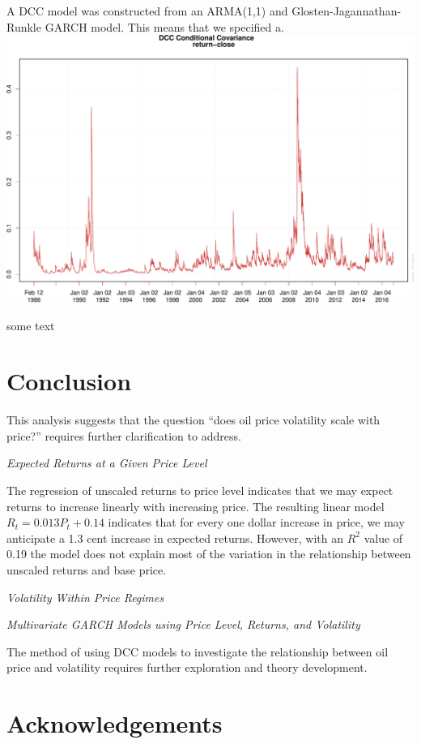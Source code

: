 \documentclass[]{article}
\begin{document}
A DCC model was constructed from an ARMA(1,1) and
Glosten-Jagannathan-Runkle GARCH model. This means that we specified
a.\\
\includegraphics{Figs/unnamed-chunk-19-1.pdf}

some text

\section{Conclusion}\label{conclusion}

This analysis suggests that the question ``does oil price volatility
scale with price?'' requires further clarification to address.

\emph{Expected Returns at a Given Price Level}

The regression of unscaled returns to price level indicates that we may
expect returns to increase linearly with increasing price. The resulting
linear model \(R_t = 0.013P_t+0.14\) indicates that for every one dollar
increase in price, we may anticipate a 1.3 cent increase in expected
returns. However, with an \(R^2\) value of 0.19 the model does not
explain most of the variation in the relationship between unscaled
returns and base price.

\emph{Volatility Within Price Regimes}

\emph{Multivariate GARCH Models using Price Level, Returns, and
Volatility}

The method of using DCC models to investigate the relationship between
oil price and volatility requires further exploration and theory
development.

\section{Acknowledgements}\label{acknowledgements}
\end{document}

